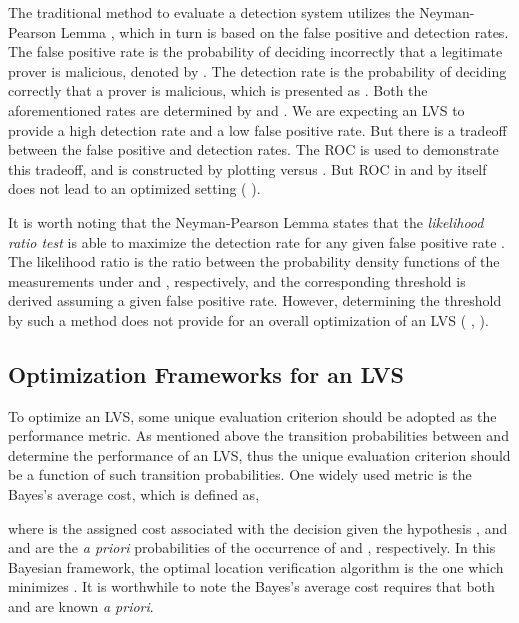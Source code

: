 \documentclass[journal]{IEEEtran}
\begin{document}
The traditional method to evaluate a detection system utilizes the Neyman-Pearson Lemma \cite{neyman1933problem,barkat2005signal}, which in turn is based on the false positive and detection rates. The false positive rate is the probability of deciding incorrectly that a legitimate prover is malicious, denoted by . The detection rate is the probability of deciding correctly that a prover is malicious, which is presented as . Both the aforementioned rates are determined by  and .
We are expecting an LVS to provide a high detection rate and a low false positive rate. But there is a tradeoff between the false positive and detection rates. The ROC is used to demonstrate this tradeoff, and is constructed by plotting  versus . But ROC in and by itself does not lead to an optimized setting ( \cite{yan2012optimal}).

It is worth noting that the Neyman-Pearson Lemma states that the \emph{likelihood ratio test} is able to maximize the detection rate for any given false positive rate \cite{neyman1933problem,barkat2005signal}. The likelihood ratio is the ratio between the probability density functions of the measurements under  and , respectively, and the corresponding threshold  is derived assuming a given false positive rate. However, determining the threshold  by such a method does not provide for an overall optimization of an LVS ( \cite{neyman1933problem}, \cite{barkat2005signal}).




\subsection{Optimization Frameworks for an LVS}\label{LVS_optimization}

To optimize an LVS, some unique evaluation criterion should be adopted as the performance metric. As mentioned above the transition probabilities between  and  determine the performance of an LVS, thus the unique evaluation criterion should be a function of such transition probabilities.
One widely used metric is the Bayes's average cost, which is defined as\cite{barkat2005signal},

where  is the assigned cost associated with the decision  given the hypothesis , and  and  are the \emph{a priori} probabilities of the occurrence of  and , respectively. In this Bayesian framework, the optimal location verification algorithm is the one which minimizes .  It is worthwhile to note the Bayes's average cost requires that both  and  are known \emph{a priori}.
\end{document}
